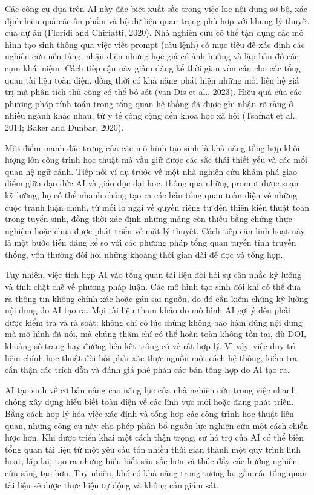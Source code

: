 Các công cụ dựa trên AI này đặc biệt xuất sắc trong việc lọc nội dung sơ bộ, xác định hiệu quả các ấn phẩm và bộ dữ liệu quan trọng phù hợp với khung lý thuyết của dự án (Floridi and Chiriatti, 2020). Nhà nghiên cứu có thể tận dụng các mô hình tạo sinh thông qua việc viết prompt (câu lệnh) có mục tiêu để xác định các nghiên cứu nền tảng, nhận diện những học giả có ảnh hưởng và lập bản đồ các cụm khái niệm. Cách tiếp cận này giảm đáng kể thời gian vốn cần cho các tổng quan tài liệu toàn diện, đồng thời có khả năng phát hiện những mối liên hệ giá trị mà phân tích thủ công có thể bỏ sót (van Dis et al., 2023). Hiệu quả của các phương pháp tính toán trong tổng quan hệ thống đã được ghi nhận rõ ràng ở nhiều ngành khác nhau, từ y tế công cộng đến khoa học xã hội (Tsafnat et al., 2014; Baker and Dunbar, 2020).

Một điểm mạnh đặc trưng của các mô hình tạo sinh là khả năng tổng hợp khối lượng lớn công trình học thuật mà vẫn giữ được các sắc thái thiết yếu và các mối quan hệ ngữ cảnh. Tiếp nối ví dụ trước về một nhà nghiên cứu khám phá giao điểm giữa đạo đức AI và giáo dục đại học, thông qua những prompt được soạn kỹ lưỡng, họ có thể nhanh chóng tạo ra các bản tổng quan toàn diện về những cuộc tranh luận chính, từ mối lo ngại về quyền riêng tư đến thiên kiến thuật toán trong tuyển sinh, đồng thời xác định những mảng còn thiếu bằng chứng thực nghiệm hoặc chưa được phát triển về mặt lý thuyết. Cách tiếp cận linh hoạt này là một bước tiến đáng kể so với các phương pháp tổng quan tuyến tính truyền thống, vốn thường đòi hỏi những khoảng thời gian dài để đọc và tổng hợp.

Tuy nhiên, việc tích hợp AI vào tổng quan tài liệu đòi hỏi sự cân nhắc kỹ lưỡng và tính chặt chẽ về phương pháp luận. Các mô hình tạo sinh đôi khi có thể đưa ra thông tin không chính xác hoặc gán sai nguồn, do đó cần kiểm chứng kỹ lưỡng nội dung do AI tạo ra. Mọi tài liệu tham khảo do mô hình AI gợi ý đều phải được kiểm tra và rà soát: không chỉ có lúc chúng không bao hàm đúng nội dung mà mô hình đã nói, mà chúng thậm chí có thể hoàn toàn không tồn tại, dù DOI, khoảng số trang hay đường liên kết trông có vẻ rất hợp lý. Vì vậy, việc duy trì liêm chính học thuật đòi hỏi phải xác thực nguồn một cách hệ thống, kiểm tra cẩn thận các trích dẫn và đánh giá phê phán các bản tổng hợp do AI tạo ra.

AI tạo sinh về cơ bản nâng cao năng lực của nhà nghiên cứu trong việc nhanh chóng xây dựng hiểu biết toàn diện về các lĩnh vực mới hoặc đang phát triển. Bằng cách hợp lý hóa việc xác định và tổng hợp các công trình học thuật liên quan, những công cụ này cho phép phân bổ nguồn lực nghiên cứu một cách chiến lược hơn. Khi được triển khai một cách thận trọng, sự hỗ trợ của AI có thể biến tổng quan tài liệu từ một yêu cầu tốn nhiều thời gian thành một quy trình linh hoạt, lặp lại, tạo ra những hiểu biết sâu sắc hơn và thúc đẩy các hướng nghiên cứu sáng tạo hơn. Tuy nhiên, khó có khả năng trong tương lai gần các tổng quan tài liệu sẽ được thực hiện tự động và không cần giám sát.

